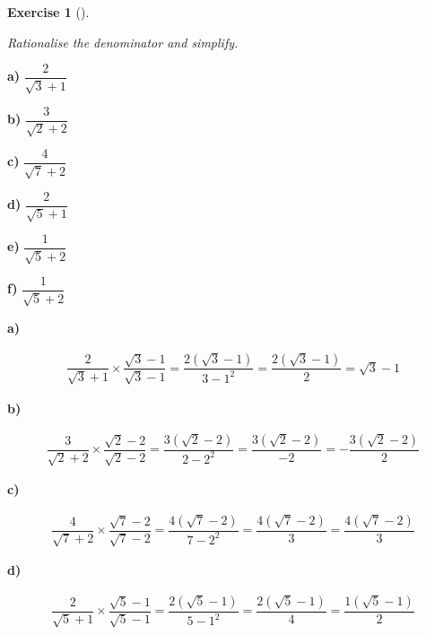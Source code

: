 \documentclass[
  letterpaper,
  DIV=11,
  numbers=noendperiod]{scrreprt}
\theoremstyle{definition}
\newtheorem{exercise}{Exercise}[chapter]
\theoremstyle{remark}
\begin{document}
\begin{exercise}[]\protect\hypertarget{exr-u2-53}{}\label{exr-u2-53}

\emph{Rationalise the denominator and simplify.}

\textbf{a)} \(\displaystyle \dfrac{2}{\sqrt{3}+1}\)

\textbf{b)} \(\displaystyle \dfrac{3}{\sqrt{2}+2}\)

\textbf{c)} \(\displaystyle \dfrac{4}{\sqrt{7}+2}\)

\textbf{d)} \(\displaystyle \dfrac{2}{\sqrt{5}+1}\)

\textbf{e)} \(\displaystyle \dfrac{1}{\sqrt{5}+2}\)

\textbf{f)} \(\displaystyle \dfrac{1}{\sqrt{5}+2}\)

\begin{tcolorbox}[enhanced jigsaw, opacitybacktitle=0.6, coltitle=black, arc=.35mm, colframe=quarto-callout-tip-color-frame, colback=white, bottomrule=.15mm, left=2mm, colbacktitle=quarto-callout-tip-color!10!white, titlerule=0mm, opacityback=0, title=\textcolor{quarto-callout-tip-color}{\faLightbulb}\hspace{0.5em}{🔍 View Solutions}, leftrule=.75mm, breakable, rightrule=.15mm, bottomtitle=1mm, toptitle=1mm, toprule=.15mm]

\textbf{a)}

\[
\begin{aligned}
\dfrac{2}{\sqrt{3}+1}\times\dfrac{\sqrt{3}-1}{\sqrt{3}-1}=\dfrac{2(\sqrt{3}-1)}{3-1^2}=\dfrac{2(\sqrt{3}-1)}{2}=\sqrt{3}-1
\end{aligned}
\]

\textbf{b)}

\[
\begin{aligned}
\dfrac{3}{\sqrt{2}+2}\times\dfrac{\sqrt{2}-2}{\sqrt{2}-2}=\dfrac{3(\sqrt{2}-2)}{2-2^2}=\dfrac{3(\sqrt{2}-2)}{-2}=-\dfrac{3(\sqrt{2}-2)}{2}
\end{aligned}
\]

\textbf{c)}

\[
\begin{aligned}
\dfrac{4}{\sqrt{7}+2}\times\dfrac{\sqrt{7}-2}{\sqrt{7}-2}=\dfrac{4(\sqrt{7}-2)}{7-2^2}=\dfrac{4(\sqrt{7}-2)}{3}=\dfrac{4(\sqrt{7}-2)}{3}
\end{aligned}
\]

\textbf{d)}

\[
\begin{aligned}
\dfrac{2}{\sqrt{5}+1}\times\dfrac{\sqrt{5}-1}{\sqrt{5}-1}=\dfrac{2(\sqrt{5}-1)}{5-1^2}=\dfrac{2(\sqrt{5}-1)}{4}=\dfrac{1(\sqrt{5}-1)}{2}
\end{aligned}
\]


\end{tcolorbox}
\end{exercise}
\end{document}
